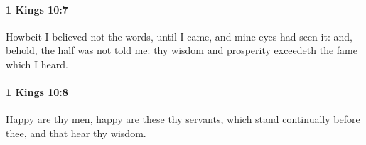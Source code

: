 		\paragraph{1 Kings 10:7} %
			\label{1KINGS-10-7}

			Howbeit I believed not the words, until I came, and mine eyes had seen it: and, behold, the half was not told me: thy wisdom and prosperity exceedeth the fame which I heard.


		\paragraph{1 Kings 10:8} %
			\label{1KINGS-10-8}

			Happy are thy men, happy are these thy servants, which stand continually before thee, and that hear thy wisdom.


